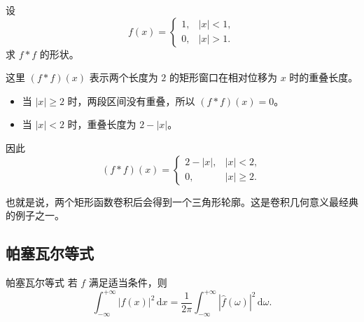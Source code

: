 \begin{lizi}{}{}
设
\begin{equation}
    f(x)=
    \begin{cases}
        1, & |x|<1, \\
        0, & |x|>1.
    \end{cases}
\end{equation}
求 $f*f$ 的形状。

\begin{jie}
这里 $(f*f)(x)$ 表示两个长度为 $2$ 的矩形窗口在相对位移为 $x$ 时的重叠长度。

\begin{itemize}
    \item 当 $|x|\ge 2$ 时，两段区间没有重叠，所以 $(f*f)(x)=0$。
    \item 当 $|x|<2$ 时，重叠长度为 $2-|x|$。
\end{itemize}

因此
\begin{equation}
    (f*f)(x)=
    \begin{cases}
        2-|x|, & |x|<2, \\
        0, & |x|\ge 2.
    \end{cases}
\end{equation}

也就是说，两个矩形函数卷积后会得到一个三角形轮廓。这是卷积几何意义最经典的例子之一。
\end{jie}
\end{lizi}

\subsection{帕塞瓦尔等式}

\begin{dingli}{帕塞瓦尔等式}{}
若 $f$ 满足适当条件，则
\begin{equation}
    \int_{-\infty}^{+\infty} |f(x)|^2\,\mathrm{d}x
    =
    \frac{1}{2\pi}
    \int_{-\infty}^{+\infty} |\hat{f}(\omega)|^2\,\mathrm{d}\omega.
\end{equation}
\end{dingli}

